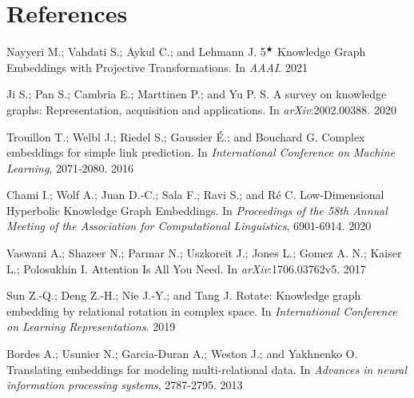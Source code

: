 \documentclass[11pt]{article}
\begin{document}


\section{References}
\hypertarget{Nay21}{Nayyeri M.; Vahdati S.; Aykul C.; and Lehmann J. 5$^\bigstar$ Knowledge Graph Embeddings with Projective Transformations. In \textit{AAAI}. 2021} 

\hypertarget{JiS20}{Ji S.; Pan S.; Cambria E.; Marttinen P.; and Yu P. S. A survey on knowledge graphs: Representation, acquisition and applications. In \textit{arXiv}:2002.00388. 2020} 

\hypertarget{Tro16}{Trouillon T.; Welbl J.; Riedel S.; Gaussier É.; and Bouchard G. Complex embeddings for simple link prediction. In \textit{International Conference on Machine Learning}, 2071-2080. 2016} 

\hypertarget{Cha20}{Chami I.; Wolf A.; Juan D.-C.; Sala F.; Ravi S.; and Ré C. Low-Dimensional Hyperbolic Knowledge Graph Embeddings. In \textit{Proceedings of the 58th Annual Meeting of the Association for Computational Linguistics}, 6901-6914. 2020} 

\hypertarget{Vas17}{Vaswani A.; Shazeer N.; Parmar N.; Uszkoreit J.; Jones L.; Gomez A. N.; Kaiser L.; Polosukhin I. Attention Is All You Need. In \textit{arXiv}:1706.03762v5. 2017} 

\hypertarget{Sun19}{Sun Z.-Q.; Deng Z.-H.; Nie J.-Y.; and Tang J. Rotate: Knowledge graph embedding by relational rotation in complex space. In \textit{International Conference on Learning Representations}. 2019} 

\hypertarget{Bor13}{Bordes A.; Usunier N.; Garcia-Duran A.; Weston J.; and Yakhnenko O. Translating embeddings for modeling multi-relational data. In \textit{Advances in neural information processing systems}, 2787-2795. 2013} 
\end{document}
